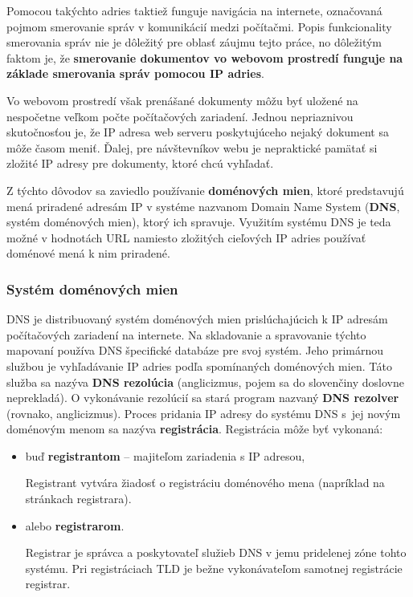 Pomocou takýchto adries taktiež funguje navigácia na internete, označovaná pojmom smerovanie správ v komunikácií medzi počítačmi.
Popis funkcionality smerovania správ nie je dôležitý pre oblasť záujmu tejto práce, no dôležitým faktom je, že \textbf{smerovanie dokumentov vo webovom prostredí funguje na základe smerovania správ pomocou IP adries}.

Vo webovom prostredí však prenášané dokumenty môžu byť uložené na nespočetne veľkom počte počítačových zariadení.
Jednou nepriaznivou skutočnosťou je, že IP adresa web serveru poskytujúceho nejaký dokument sa môže časom meniť.
Ďalej, pre návštevníkov webu je nepraktické pamätať si zložité IP adresy pre dokumenty, ktoré chcú vyhľadať.

Z týchto dôvodov sa zaviedlo používanie \textbf{doménových mien}, ktoré predstavujú mená priradené adresám IP v systéme nazvanom Domain Name System (\textbf{DNS}, systém doménových mien), ktorý ich spravuje.
Využitím systému DNS je teda možné v hodnotách URL namiesto zložitých cieľových IP adries používať doménové mená k nim priradené.  

\subsubsection{Systém doménových mien}

DNS je distribuovaný systém doménových mien prislúchajúcich k IP adresám počítačových zariadení na internete.
Na skladovanie a spravovanie týchto mapovaní používa DNS špecifické databáze pre svoj systém. 
Jeho primárnou službou je vyhľadávanie IP adries podľa spomínaných doménových mien.
Táto služba sa nazýva \textbf{DNS rezolúcia} (anglicizmus, pojem sa do slovenčiny doslovne neprekladá). 
O vykonávanie rezolúcií sa stará program nazvaný \textbf{DNS rezolver} (rovnako, anglicizmus).
Proces pridania IP adresy do systému DNS \mbox{s jej} novým doménovým menom sa nazýva \textbf{registrácia}.
Registrácia môže byť vykonaná:
\begin{itemize}
    \item buď \textbf{registrantom} -- majiteľom zariadenia s IP adresou,

    Registrant vytvára žiadosť o registráciu doménového mena (napríklad na stránkach registrara).

    \item alebo \textbf{registrarom}.

    Registrar je správca a poskytovateľ služieb DNS v jemu pridelenej zóne tohto systému. %
    Pri registráciach TLD je bežne vykonávateľom samotnej registrácie registrar. %
\end{itemize}

